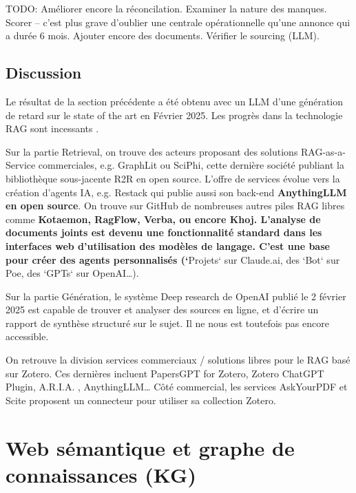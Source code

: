 \documentclass[a4paper,11pt]{report}
\begin{document}
TODO: Améliorer encore la réconcilation. Examiner la nature des manques. Scorer -- c'est plus grave d'oublier une centrale opérationnelle qu'une annonce qui a durée 6 mois. Ajouter encore des documents. Vérifier le sourcing (LLM).

\section{Discussion}\label{discussion-1}

Le résultat de la section précédente a été obtenu avec un LLM d'une génération de retard sur le state of the art en Février 2025. Les progrès dans la technologie RAG sont incessants \citep{UEIVYTV4,SQX6VZRP}.

Sur la partie Retrieval, on trouve des acteurs proposant des solutions RAG-as-a-Service commerciales, e.g. GraphLit ou SciPhi, cette dernière société publiant la bibliothèque sous-jacente R2R en open source. L'offre de services évolue vers la création d'agents IA, e.g. Restack qui publie aussi son back-end \textbf{\textbf{AnythingLLM }\textbf{en open source}}. On trouve sur GitHub de nombreuses autres piles RAG libres comme \textbf{\textbf{Kotaemon, RagFlow, Verba, }\textbf{ou encore Khoj}\textbf{. L'analyse de documents joints est devenu une fonctionnalité standard dans les interfaces web d'utilisation des modèles de langage. C'est }\textbf{une }\textbf{base }\textbf{pour créer }\textbf{des }\textbf{agents perso}\textbf{n}\textbf{nalisés (}\textbf{`}}Projets` sur Claude.ai, des `Bot` sur Poe, des `GPTs` sur OpenAI\ldots).

Sur la partie Génération, le système Deep research de OpenAI \citep{Y6A39QJJ} publié le 2 février 2025 est capable de trouver et analyser des sources en ligne, et d'écrire un rapport de synthèse structuré sur le sujet. Il ne nous est toutefois pas encore accessible.

On retrouve la division services commerciaux / solutions libres pour le RAG basé sur Zotero. Ces dernières incluent PapersGPT for Zotero, Zotero ChatGPT Plugin, A.R.I.A. , AnythingLLM\ldots{} Côté commercial, les services AskYourPDF et Scite proposent un connecteur pour utiliser sa collection Zotero.

\chapter{Web sémantique et graphe de connaissances (KG)}\label{web-suxe9mantique-et-graphe-de-connaissances-kg}
\end{document}
